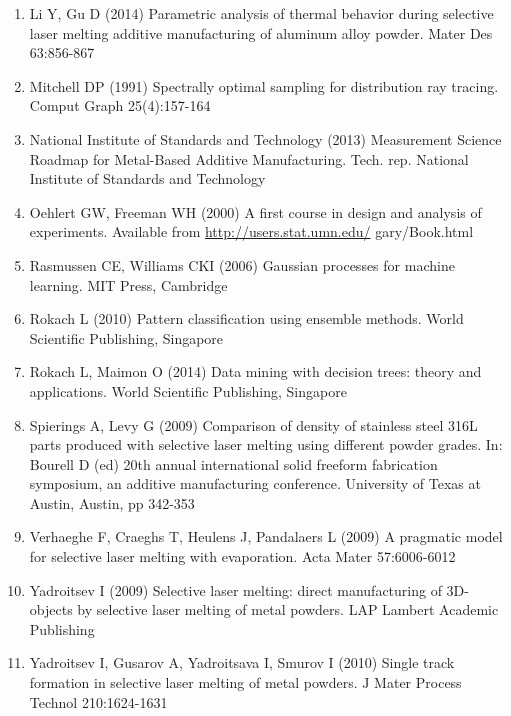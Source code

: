 \documentclass[10pt]{article}
\begin{document}
\begin{enumerate}
  \item Li Y, Gu D (2014) Parametric analysis of thermal behavior during selective laser melting additive manufacturing of aluminum alloy powder. Mater Des 63:856-867

  \item Mitchell DP (1991) Spectrally optimal sampling for distribution ray tracing. Comput Graph 25(4):157-164

  \item National Institute of Standards and Technology (2013) Measurement Science Roadmap for Metal-Based Additive Manufacturing. Tech. rep. National Institute of Standards and Technology

  \item Oehlert GW, Freeman WH (2000) A first course in design and analysis of experiments. Available from \href{http://users.stat.umn.edu/}{http://users.stat.umn.edu/} gary/Book.html

  \item Rasmussen CE, Williams CKI (2006) Gaussian processes for machine learning. MIT Press, Cambridge

  \item Rokach L (2010) Pattern classification using ensemble methods. World Scientific Publishing, Singapore

  \item Rokach L, Maimon O (2014) Data mining with decision trees: theory and applications. World Scientific Publishing, Singapore

  \item Spierings A, Levy G (2009) Comparison of density of stainless steel 316L parts produced with selective laser melting using different powder grades. In: Bourell D (ed) 20th annual international solid freeform fabrication symposium, an additive manufacturing conference. University of Texas at Austin, Austin, pp 342-353

  \item Verhaeghe F, Craeghs T, Heulens J, Pandalaers L (2009) A pragmatic model for selective laser melting with evaporation. Acta Mater 57:6006-6012

  \item Yadroitsev I (2009) Selective laser melting: direct manufacturing of 3D-objects by selective laser melting of metal powders. LAP Lambert Academic Publishing

  \item Yadroitsev I, Gusarov A, Yadroitsava I, Smurov I (2010) Single track formation in selective laser melting of metal powders. $\mathrm{J}$ Mater Process Technol 210:1624-1631


\end{enumerate}
\end{document}
